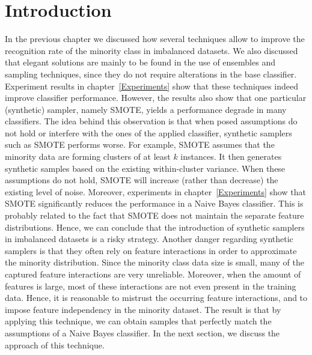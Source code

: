 \section{Introduction}\label{rnd-intro}
In the previous chapter we discussed how several techniques allow to improve the recognition rate of the minority class in imbalanced datasets. We also discussed that elegant solutions are mainly to be found in the use of ensembles and sampling techniques, since they do not require alterations in the base classifier. Experiment results in chapter~\ref{Experiments} show that these techniques indeed improve classifier performance. However, the results also show that one particular (synthetic) sampler, namely SMOTE, yields a performance degrade in many classifiers. The idea behind this observation is that when posed assumptions do not hold or interfere with the ones of the applied classifier, synthetic samplers such as SMOTE performs worse. For example, SMOTE assumes that the minority data are forming clusters of at least \(k\) instances. It then generates synthetic samples based on the existing within-cluster variance. When these assumptions do not hold, SMOTE will increase (rather than decrease) the existing level of noise. Moreover, experiments in chapter~\ref{Experiments} show that SMOTE significantly reduces the performance in a Naive Bayes classifier. This is probably related to the fact that SMOTE does not maintain the separate feature distributions.  Hence, we can conclude that the introduction of synthetic samplers in imbalanced datasets is a risky strategy. Another danger regarding synthetic samplers is that they often rely on feature interactions in order to approximate the minority distribution. Since the minority class data size is small, many of the captured feature interactions are very unreliable. Moreover, when the amount of features is large, most of these interactions are not even present in the training data. Hence, it is reasonable to mistrust the occurring feature interactions, and to impose feature independency in the minority dataset. The result is that by applying this technique, we can obtain samples that perfectly match the assumptions of a Naive Bayes classifier. In the next section, we discuss the approach of this technique.


